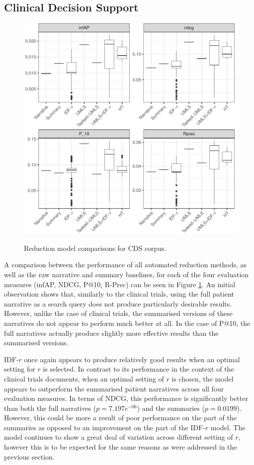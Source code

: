 \documentclass[a4paper]{report}
\begin{document}
\subsection{Clinical Decision Support}
\begin{figure}
\centering
\caption{Reduction model comparisons for CDS corpus.}
\includegraphics[width=.9\columnwidth]{cdsreduction.pdf}
\label{fig:cds_results}
\end{figure}

A comparison between the performance of all automated reduction methods, as well as the raw narrative and summary baselines, for each of the four evaluation measures (infAP, NDCG, P@10, R-Prec) can be seen in Figure \ref{fig:cds_results}. An initial observation shows that, similarly to the clinical trials, using the full patient narrative as a search query does not produce particularly desirable results. However, unlike the case of clinical trials, the summarised versions of these narratives do not appear to perform much better at all. In the case of P@10, the full narratives actually produce slightly more effective results than the summarised versions. 

IDF-$r$ once again appears to produce relatively good results when an optimal setting for $r$ is selected. In contrast to its performance in the context of the clinical trials documents, when an optimal setting of $r$ is chosen, the model appears to outperform the summarised patient narratives across all four evaluation measures. In terms of NDCG, this performance is significantly better than both the full narratives ($p=7.197e^{-06}$) and the summaries ($p=0.0199$). However, this could be more a result of poor performance on the part of the summaries as opposed to an improvement on the part of the IDF-$r$ model. The model continues to show a great deal of variation across different setting of $r$, however this is to be expected for the same reasons as were addressed in the previous section.
\end{document}
